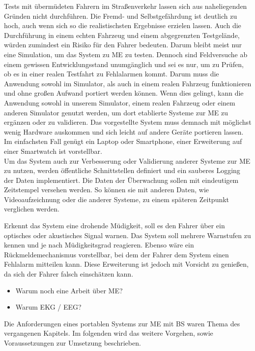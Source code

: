 {Tests mit übermüdeten Fahrern im Straßenverkehr lassen sich aus naheliegenden Gründen nicht durchführen. Die Fremd- und Selbstgefährdung ist deutlich zu hoch, auch wenn sich so die realistischsten Ergebnisse erzielen lassen. Auch die Durchführung in einem echten Fahrzeug und einem abgegrenzten Testgelände, würden zumindest ein Risiko für den Fahrer bedeuten. Darum bleibt meist nur eine Simulation, um das System zu \acl{ME} zu testen. 
Dennoch sind Feldversuche ab einem gewissen Entwicklungsstand unumgänglich und sei es nur, um zu Prüfen, ob es in einer realen Testfahrt zu Fehlalarmen kommt. Darum muss die Anwendung sowohl im Simulator, als auch in einem realen Fahrzeug funktionieren und ohne großen Aufwand portiert werden können. Wenn dies gelingt, kann die Anwendung sowohl in unserem Simulator, einem realen Fahrzeug oder einem anderen Simulator genutzt werden, um dort etablierte Systeme zur \acl{ME} zu ergänzen oder zu  validieren.
Das vorgestellte System muss demnach mit möglichst wenig Hardware auskommen und sich leicht auf andere Geräte portieren lassen. Im einfachsten Fall genügt ein Laptop oder Smartphone, einer Erweiterung auf einer Smartwatch ist vorstellbar.\\

Um das System auch zur Verbesserung oder Validierung anderer Systeme zur \acl{ME} zu nutzen, werden öffentliche Schnittstellen definiert und ein sauberes Logging der Daten implementiert. Die Daten der Überwachung sollen mit eindeutigem Zeitstempel versehen werden. So können sie mit anderen Daten, wie Videoaufzeichnung oder die anderer Systeme, zu einem späteren Zeitpunkt verglichen werden. 

Erkennt das System eine drohende Müdigkeit, soll es den Fahrer über ein optisches oder akustisches Signal warnen. Das System soll mehrere Warnstufen zu kennen und je nach Müdigkeitsgrad reagieren. Ebenso wäre ein Rückmeldemechanismus vorstellbar, bei dem der Fahrer dem System einen Fehlalarm mitteilen kann. Diese Erweiterung ist jedoch mit Vorsicht zu genießen, da sich der Fahrer falsch einschätzen kann.

\begin{itemize}
  \item Warum noch eine Arbeit über \acl{ME}?
  \item Warum EKG / EEG?
\end{itemize}

Die Anforderungen eines portablen Systems zur \acl{ME} mit \acl{BS} waren Thema des vergangenen Kapitels. Im folgenden wird das weitere Vorgehen, sowie Voraussetzungen zur Umsetzung beschrieben.

}
